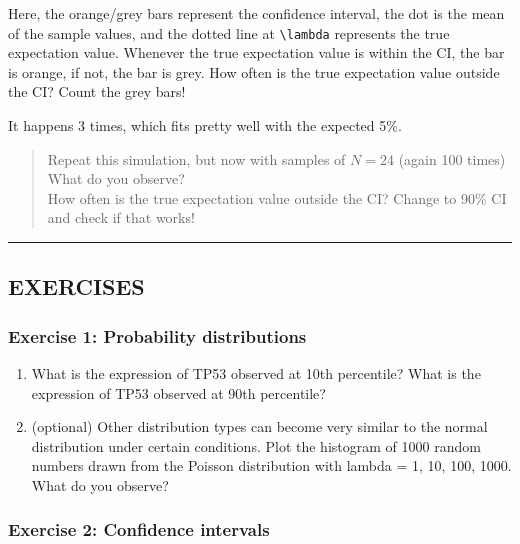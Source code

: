 \documentclass[
]{book}
\begin{document}
Here, the orange/grey bars represent the confidence interval, the dot is the mean of the sample values, and the dotted line at \texttt{\textbackslash{}lambda} represents the true expectation value. Whenever the true expectation value is within the CI, the bar is orange, if not, the bar is grey. How often is the true expectation value outside the CI? Count the grey bars!

It happens 3 times, which fits pretty well with the expected 5\%.

\begin{quote}
Repeat this simulation, but now with samples of \(N=24\) (again 100 times)\\
What do you observe?\\
How often is the true expectation value outside the CI? Change to 90\% CI and check if that works!
\end{quote}

\begin{center}\rule{0.5\linewidth}{0.5pt}\end{center}

\hypertarget{exercises-2}{%
\subsection{EXERCISES}\label{exercises-2}}

\hypertarget{exercise-1-probability-distributions}{%
\subsubsection{Exercise 1: Probability distributions}\label{exercise-1-probability-distributions}}

\begin{enumerate}
\def\labelenumi{\arabic{enumi}.}
\item
  What is the expression of TP53 observed at 10th percentile? What is the expression of TP53 observed at 90th percentile?
\item
  (optional) Other distribution types can become very similar to the normal distribution under certain conditions. Plot the histogram of 1000 random numbers drawn from the Poisson distribution with lambda = 1, 10, 100, 1000. What do you observe?
\end{enumerate}

\hypertarget{exercise-2-confidence-intervals}{%
\subsubsection{Exercise 2: Confidence intervals}\label{exercise-2-confidence-intervals}}
\end{document}
